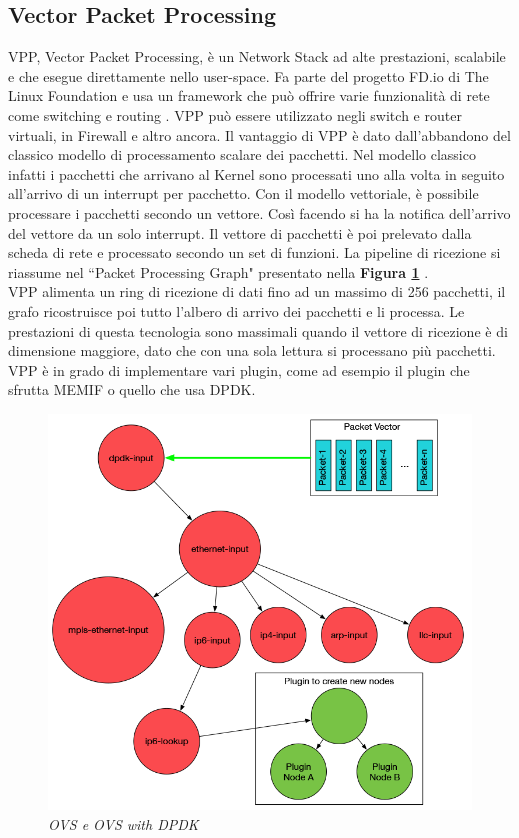 \subsection*{Vector Packet Processing}
VPP, Vector Packet Processing, è un Network Stack ad alte prestazioni, scalabile e che esegue direttamente nello user-space.
Fa parte del progetto FD.io di The Linux Foundation e usa un framework che può offrire varie funzionalità di rete come switching e routing \cite{noauthor_what_nodate}.
VPP può essere utilizzato negli switch e router virtuali, in Firewall e altro ancora.
Il vantaggio di VPP è dato dall'abbandono del classico modello di processamento scalare dei pacchetti. Nel modello classico infatti i pacchetti che arrivano al Kernel sono processati uno alla volta in seguito all'arrivo di un interrupt per pacchetto.
Con il modello vettoriale, è possibile processare i pacchetti secondo un vettore. Così facendo si ha la notifica dell'arrivo del vettore da un solo interrupt. Il vettore di pacchetti è poi prelevato dalla scheda di rete e processato secondo un set di funzioni.
La pipeline di ricezione si riassume nel ``Packet Processing Graph" \cite{noauthor_packet_nodate} presentato nella \textbf{{Figura \ref{fig:vpp_graph}}}
.\\
VPP alimenta un ring di ricezione di dati fino ad un massimo di 256 pacchetti, il grafo ricostruisce poi tutto l'albero di arrivo dei pacchetti e li processa.
Le prestazioni di questa tecnologia sono massimali quando il vettore di ricezione è di dimensione maggiore, dato che con una sola lettura si processano più pacchetti.
VPP è in grado di implementare vari plugin, come ad esempio il plugin che sfrutta MEMIF \cite{noauthor_fdio_nodate} o quello che usa DPDK.
\FloatBarrier
\begin{figure}[h]
\includegraphics[scale=0.4]{images/vpp_graph.jpg}
\centering
\caption{\textit{OVS e OVS with DPDK}}
\vspace{1cm}
\label{fig:vpp_graph}
\end{figure}
\FloatBarrier

